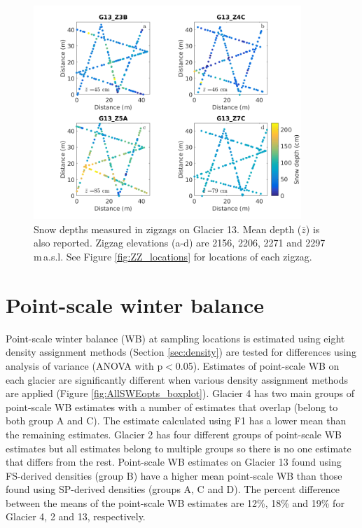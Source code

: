 \documentclass{sfuthesis}
\begin{document}
\begin{figure}[H] 
	\centering
	 \includegraphics[width=0.9\textwidth]{ZigzagDepth_G13.png}%
	\caption{Snow depths measured in zigzags on Glacier 13. Mean depth ($\bar{z}$) is also reported. Zigzag elevations (a-d) are 2156, 2206, 2271 and 2297 \,m\,a.s.l. See Figure \ref{fig:ZZ_locations} for locations of each zigzag.}
	\label{fig:ZZ_G13}
\end{figure}


\section{Point-scale winter balance}

Point-scale winter balance (WB) at sampling locations is estimated using eight density assignment methods (Section \ref{sec:density}) are tested for differences using analysis of variance (ANOVA with p$<$0.05). Estimates of point-scale WB on each glacier are significantly different when various density assignment methods are applied (Figure \ref{fig:AllSWEopts_boxplot}). Glacier 4 has two main groups of point-scale WB estimates with a number of estimates that overlap (belong to both group A and C). The estimate calculated using F1 has a lower mean than the remaining estimates. Glacier 2 has four different groups of point-scale WB estimates but all estimates belong to multiple groups so there is no one estimate that differs from the rest. Point-scale WB estimates on Glacier 13 found using FS-derived densities (group B) have a higher mean point-scale WB than those found using SP-derived densities (groups A, C and D). The percent difference between the means of the point-scale WB estimates are 12\%, 18\% and 19\%  for Glacier 4, 2 and 13, respectively. 
\end{document}
